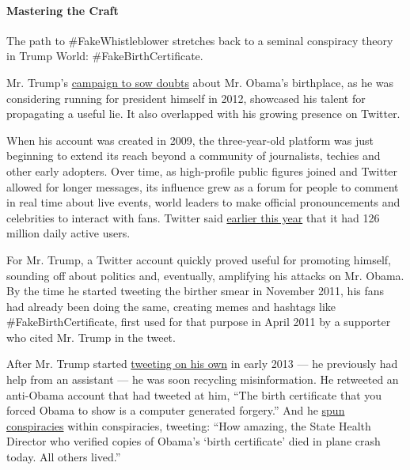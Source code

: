 \hypertarget{mastering-the-craft}{%
\paragraph{Mastering the Craft}\label{mastering-the-craft}}

The path to \#FakeWhistleblower stretches back to a seminal conspiracy
theory in Trump World: \#FakeBirthCertificate.

Mr. Trump's
\href{https://www.theguardian.com/us-news/video/2016/sep/16/donald-trump-barack-obama-birther-theory-video}{campaign
to sow doubts} about Mr. Obama's birthplace, as he was considering
running for president himself in 2012, showcased his talent for
propagating a useful lie. It also overlapped with his growing presence
on Twitter.

When his account was created in 2009, the three-year-old platform was
just beginning to extend its reach beyond a community of journalists,
techies and other early adopters. Over time, as high-profile public
figures joined and Twitter allowed for longer messages, its influence
grew as a forum for people to comment in real time about live events,
world leaders to make official pronouncements and celebrities to
interact with fans. Twitter said
\href{https://www.washingtonpost.com/technology/2019/02/07/twitter-reveals-its-daily-active-user-numbers-first-time/}{earlier
this year} that it had 126 million daily active users.

For Mr. Trump, a Twitter account quickly proved useful for promoting
himself, sounding off about politics and, eventually, amplifying his
attacks on Mr. Obama. By the time he started tweeting the birther smear
in November 2011, his fans had already been doing the same, creating
memes and hashtags like \#FakeBirthCertificate, first used for that
purpose in April 2011 by a supporter who cited Mr. Trump in the tweet.

After Mr. Trump started
\href{https://www.politico.com/story/2018/12/20/oh-no-the-day-trump-learned-to-tweet-1070789}{tweeting
on his own} in early 2013 --- he previously had help from an assistant
--- he was soon recycling misinformation. He retweeted an anti-Obama
account that had tweeted at him, ``The birth certificate that you forced
Obama to show is a computer generated forgery.'' And he
\href{https://twitter.com/realdonaldtrump/status/411247268763676673?lang=en}{spun
conspiracies} within conspiracies, tweeting: ``How amazing, the State
Health Director who verified copies of Obama's `birth certificate' died
in plane crash today. All others lived.''

